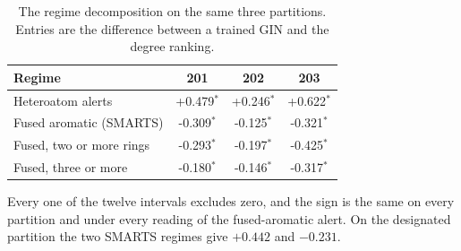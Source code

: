 \begin{table}[htbp]
\centering
\caption{The regime decomposition on the same three partitions. Entries are the difference between a trained GIN and the degree ranking.}
\label{tab:replication_regimes}
\small
\setlength{\tabcolsep}{4pt}
\begin{tabular}{lccc}
\toprule
Regime & 201 & 202 & 203 \\
\midrule
Heteroatom alerts & +0.479$^{*}$ & +0.246$^{*}$ & +0.622$^{*}$ \\
Fused aromatic (SMARTS) & -0.309$^{*}$ & -0.125$^{*}$ & -0.321$^{*}$ \\
Fused, two or more rings & -0.293$^{*}$ & -0.197$^{*}$ & -0.425$^{*}$ \\
Fused, three or more & -0.180$^{*}$ & -0.146$^{*}$ & -0.317$^{*}$ \\
\bottomrule
\end{tabular}
\begin{flushleft}\footnotesize Every one of the twelve intervals excludes zero, and the sign is the same on every partition and under every reading of the fused-aromatic alert. On the designated partition the two SMARTS regimes give $+0.442$ and $-0.231$.\end{flushleft}
\end{table}
